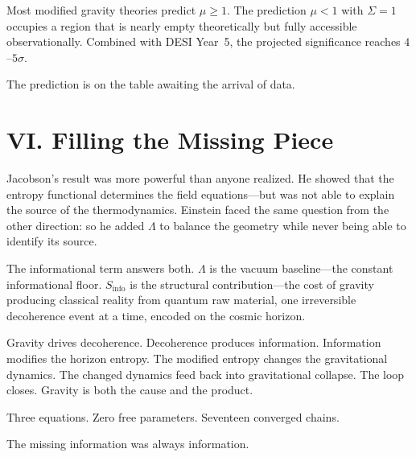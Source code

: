 \documentclass[12pt]{article}
\begin{document}
Most modified gravity theories predict $\mu \geq 1$.  The prediction
$\mu < 1$ with $\Sigma = 1$ occupies a region that is nearly empty
theoretically but fully accessible observationally.  Combined with
DESI Year~5, the projected significance reaches $4$--$5\sigma$.

The prediction is on the table awaiting the arrival of data.


\section*{VI. Filling the Missing Piece}

Jacobson's result was more powerful than anyone realized.  He showed that
the entropy functional determines the field equations---but was not able to
explain the source of the thermodynamics.  Einstein faced the same question
from the other direction: so he added $\Lambda$ to balance the geometry
while never being able to identify its source.

The informational term answers both.  $\Lambda$ is the vacuum
baseline---the constant informational floor.  $S_{\mathrm{info}}$ is the
structural contribution---the cost of gravity producing classical reality
from quantum raw material, one irreversible decoherence event at a time,
encoded on the cosmic horizon.

Gravity drives decoherence.  Decoherence produces information.  Information
modifies the horizon entropy.  The modified entropy changes the
gravitational dynamics.  The changed dynamics feed back into gravitational
collapse.  The loop closes.  Gravity is both the cause and the product.

Three equations.  Zero free parameters.  Seventeen converged chains.

The missing information was always information.



\newpage
\end{document}
